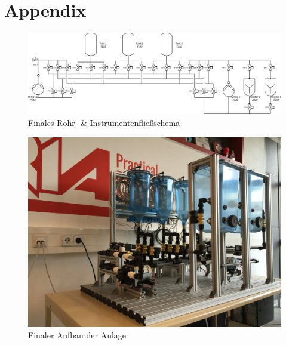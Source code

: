 \chapter{Appendix}
	\label{appendix}
	
	\begin{figure}[h!]
  		\centering
      	\includegraphics[width=1\textwidth]{graphics/implementation/RI_Impl_farblos}
  		\caption{Finales Rohr- \& Instrumentenfließschema}
	\end{figure}	
	
	\begin{figure}[h!]
  		\centering
      	\includegraphics[width=1\textwidth]{graphics/implementation/FinalerAufbau2}
  		\caption{Finaler Aufbau der Anlage}
	\end{figure}	